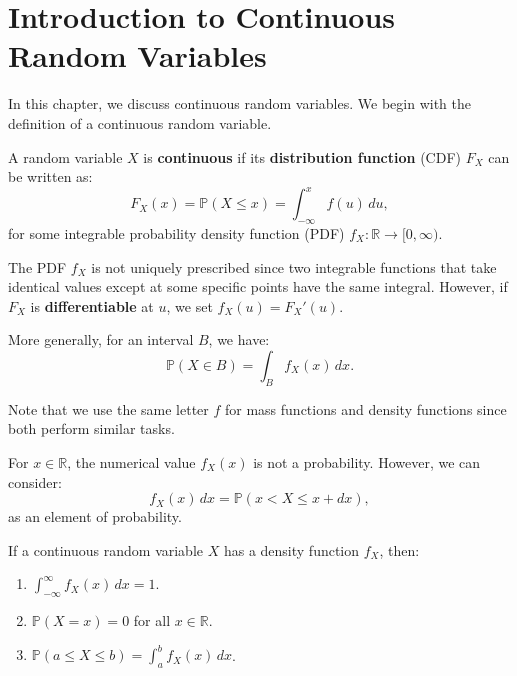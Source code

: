 \documentclass{huhtakm-template-book-v2}
\newcommand{\prob}{\mathbb{P}}
\begin{document}
\section{Introduction to Continuous Random Variables}
    In this chapter, we discuss continuous random variables. We begin with the definition of a continuous random variable.
    \begin{defn}
        A random variable $X$ is \textbf{continuous} if its \textbf{distribution function} (CDF) $F_{X}$ can be written as:
        \begin{equation*}
            F_{X}(x) = \prob(X \leq x) = \int_{-\infty}^{x}f(u)\,du,
        \end{equation*}
        for some integrable probability density function (PDF) $f_{X}:\mathbb{R} \to [0,\infty)$.
    \end{defn}
    \begin{rem}
        The PDF $f_{X}$ is not uniquely prescribed since two integrable functions that take identical values except at some specific points have the same integral. However, if $F_{X}$ is \textbf{differentiable} at $u$, we set $f_{X}(u) = F_{X}'(u)$.
    \end{rem}
    \begin{rem}
        More generally, for an interval $B$, we have:
        \begin{equation*}
            \prob(X \in B) = \int_{B}f_{X}(x)\,dx.
        \end{equation*}
    \end{rem}
    Note that we use the same letter $f$ for mass functions and density functions since both perform similar tasks.
    \begin{rem}
        For $x \in \mathbb{R}$, the numerical value $f_{X}(x)$ is not a probability. However, we can consider:
        \begin{equation*}
            f_{X}(x)\,dx = \prob(x < X \leq x+dx),
        \end{equation*}
        as an element of probability.
    \end{rem}
    \begin{lem}
        \label{Chapter 5 (Lemma) Properties of PDF}
        If a continuous random variable $X$ has a density function $f_{X}$, then:
        \begin{enumerate}
            \item $\int_{-\infty}^{\infty} f_{X}(x)\,dx = 1$.
            \item $\prob(X = x) = 0$ for all $x \in \mathbb{R}$.
            \item $\prob(a \leq X \leq b) = \int_{a}^{b}f_{X}(x)\,dx$.
        \end{enumerate}
    \end{lem}
\end{document}
